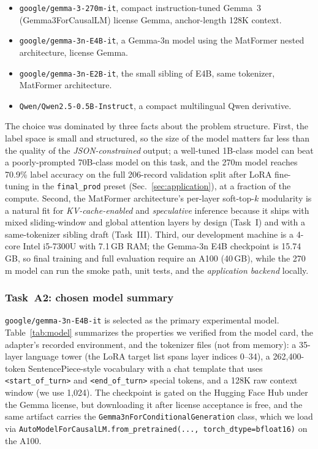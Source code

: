 \documentclass[conference]{IEEEtran}
\newcommand{\code}[1]{\texttt{\small #1}}
\newcommand{\modelname}{\texttt{google/gemma-3n-E4B-it}}
\newcommand{\draftname}{\texttt{google/gemma-3n-E2B-it}}
\newcommand{\smallname}{\texttt{google/gemma-3-270m-it}}
\begin{document}
\begin{itemize}[leftmargin=*, itemsep=1pt, topsep=2pt]
\item \smallname{}, compact instruction-tuned Gemma~3 (Gemma3ForCausalLM)
license Gemma, anchor-length 128K context.
\item \modelname{}, a Gemma-3n model using
the MatFormer nested architecture, license Gemma.
\item \draftname{}, the small sibling of E4B, same tokenizer,
MatFormer architecture.
\item \code{Qwen/Qwen2.5-0.5B-Instruct}, a compact multilingual
Qwen derivative.
\end{itemize}

The choice was dominated by three facts about the problem
structure. First, the label space is small and structured, so the
size of the model matters far less than the quality of the
\emph{JSON-constrained} output; a well-tuned 1B-class model can
beat a poorly-prompted 70B-class model on this task, and the
270m model reaches 70.9\% label accuracy on the full 206-record
validation split after LoRA fine-tuning in the \code{final\_prod}
preset (Sec.~\ref{sec:application}), at a fraction of the compute.
Second, the MatFormer architecture's
per-layer soft-top-$k$ modularity is a natural fit for
\emph{KV-cache-enabled} and \emph{speculative} inference because it
ships with mixed sliding-window and global attention layers by
design (Task~I) and with a same-tokenizer sibling draft (Task~III).
Third, our development machine is a 4-core Intel i5-7300U with
7.1\,GB RAM; the Gemma-3n E4B checkpoint is 15.74\,GB, so
final training and full evaluation require an A100 (40\,GB), while
the 270\,m model can run the smoke path,
unit tests, and the \emph{application backend} locally.

\subsubsection{Task~A2: chosen model summary}
\modelname{} is selected as the primary experimental model.
Table~\ref{tab:model} summarizes the properties we verified from
the model card, the adapter's recorded environment, and the
tokenizer files (not from memory):
a 35-layer language tower (the LoRA target list spans layer
indices 0--34), a 262{,}400-token SentencePiece-style vocabulary
with a chat template that uses \code{<start\_of\_turn>}
and \code{<end\_of\_turn>} special tokens, and a 128K raw
context window (we use 1{,}024). The checkpoint is gated on the
Hugging Face Hub under the Gemma license, but downloading it after
license acceptance is free, and the same artifact carries the
\code{Gemma3nForConditionalGeneration} class, which we load via
\code{AutoModelForCausalLM.from\_pretrained(..., torch\_dtype=bfloat16)}
on the A100.
\end{document}
